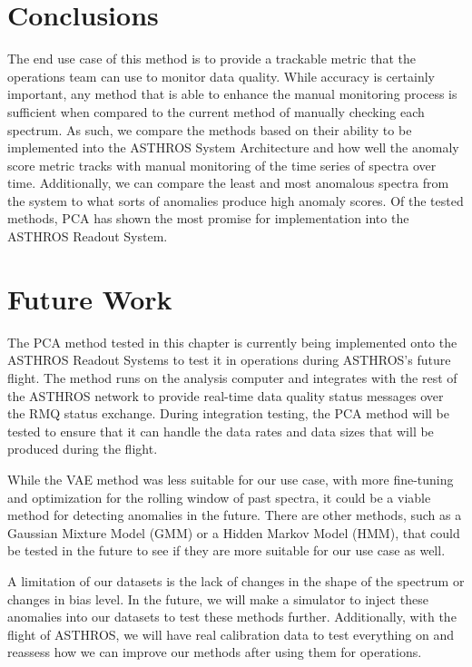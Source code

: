 \section{Conclusions}
\label{spectra/sec:conclusions}

The end use case of this method is to provide a trackable metric that the operations team can use to monitor data quality.
While accuracy is certainly important, any method that is able to enhance the manual monitoring process is sufficient when compared to the current method of manually checking each spectrum.
As such, we compare the methods based on their ability to be implemented into the ASTHROS System Architecture and how well the anomaly score metric tracks with manual monitoring of the time series of spectra over time.
Additionally, we can compare the least and most anomalous spectra from the system to what sorts of anomalies produce high anomaly scores.
Of the tested methods, PCA has shown the most promise for implementation into the ASTHROS Readout System.

\section{Future Work}
\label{spectra/sec:future}
The PCA method tested in this chapter is currently being implemented onto the ASTHROS Readout Systems to test it in operations during ASTHROS's future flight. 
The method runs on the analysis computer and integrates with the rest of the ASTHROS network to provide real-time data quality status messages over the RMQ status exchange.
During integration testing, the PCA method will be tested to ensure that it can handle the data rates and data sizes that will be produced during the flight. 

While the VAE method was less suitable for our use case, with more fine-tuning and optimization for the rolling window of past spectra, it could be a viable method for detecting anomalies in the future.
There are other methods, such as a Gaussian Mixture Model (GMM) or a Hidden Markov Model (HMM), that could be tested in the future to see if they are more suitable for our use case as well.

A limitation of our datasets is the lack of changes in the shape of the spectrum or changes in bias level. 
In the future, we will make a simulator to inject these anomalies into our datasets to test these methods further. 
Additionally, with the flight of ASTHROS, we will have real calibration data to test everything on and reassess how we can improve our methods after using them for operations.